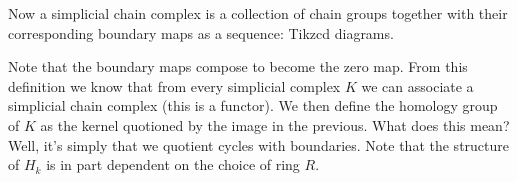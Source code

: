 Now a simplicial chain complex is a collection of chain groups together with their corresponding boundary maps as a sequence:
Tikzcd diagrams.

Note that the boundary maps compose to become the zero map. From this definition we know that from every simplicial complex $K$ we can associate a simplicial chain complex (this is a functor). We then define the homology group of $K$ as the kernel quotioned by the image in the previous. What does this mean? Well, it's simply that we quotient cycles with boundaries. Note that the structure of $H_{k}$ is in part dependent on the choice of ring $R$.

